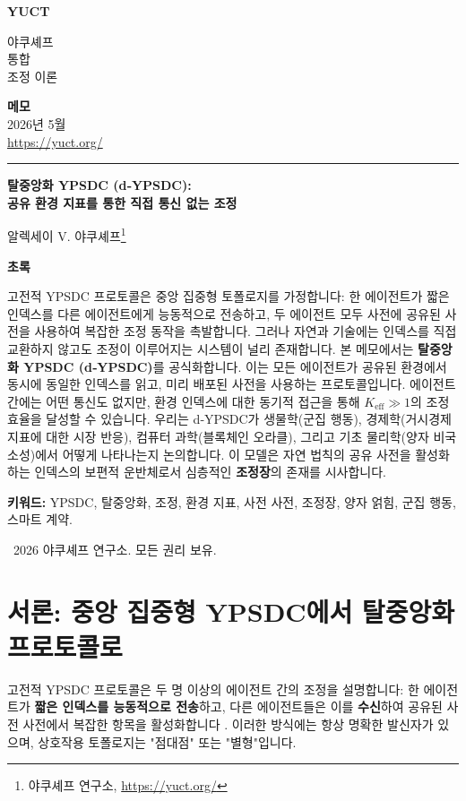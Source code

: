 \documentclass[11pt,a4paper]{article}
\newcommand{\makeheader}{%
	\noindent
	\begin{minipage}{0.17\textwidth}
		\raggedright
		{\sffamily\bfseries\color{skyblue}\fontsize{46}{46}\selectfont YUCT}%
	\end{minipage}%
	\hspace{30pt}
	\begin{minipage}{0.32\textwidth}
		\raggedright
		{\sffamily\fontsize{11}{13}\selectfont 야쿠셰프\\ 통합\\ 조정 이론}%
	\end{minipage}%
	\hfill
	\begin{minipage}{0.38\textwidth}
		\raggedleft
		{\sffamily\bfseries 메모}\\
		{\sffamily 2026년 5월}\\
		{\sffamily\footnotesize \url{https://yuct.org/}}%
	\end{minipage}
	\par\vspace{5pt}
	\noindent\textcolor{gold}{\rule{\textwidth}{1.6pt}}
	\par\vspace{0pt}
}
\begin{document}
	\renewcommand{\thepage}{\arabic{page}}
	\thispagestyle{firstpage}
	\makeheader
	
	\vspace{0cm}
	{\LARGE\bfseries 탈중앙화 YPSDC (d‑YPSDC): \\ 공유 환경 지표를 통한 직접 통신 없는 조정 \par}
	\vspace{0.2cm}
	
	{\large 알렉세이 V. 야쿠셰프\footnote{야쿠셰프 연구소, \url{https://yuct.org/}}} \\
	\vspace{0.0cm}
	
	{\color{darkblue}\textbf{\LARGE 초록}} \par
	{\large
		\noindent
		고전적 YPSDC 프로토콜은 중앙 집중형 토폴로지를 가정합니다: 한 에이전트가 짧은 인덱스를 다른 에이전트에게 능동적으로 전송하고, 두 에이전트 모두 사전에 공유된 사전을 사용하여 복잡한 조정 동작을 촉발합니다. 그러나 자연과 기술에는 인덱스를 직접 교환하지 않고도 조정이 이루어지는 시스템이 널리 존재합니다. 본 메모에서는 \textbf{탈중앙화 YPSDC (d‑YPSDC)}를 공식화합니다. 이는 모든 에이전트가 공유된 환경에서 동시에 동일한 인덱스를 읽고, 미리 배포된 사전을 사용하는 프로토콜입니다. 에이전트 간에는 어떤 통신도 없지만, 환경 인덱스에 대한 동기적 접근을 통해 \(K_{\mathrm{eff}} \gg 1\)의 조정 효율을 달성할 수 있습니다. 우리는 d‑YPSDC가 생물학(군집 행동), 경제학(거시경제 지표에 대한 시장 반응), 컴퓨터 과학(블록체인 오라클), 그리고 기초 물리학(양자 비국소성)에서 어떻게 나타나는지 논의합니다. 이 모델은 자연 법칙의 공유 사전을 활성화하는 인덱스의 보편적 운반체로서 심층적인 \textbf{조정장}의 존재를 시사합니다.
	}
	
	\vspace{0.1cm}
	\noindent
	{\color{darkblue}\textbf{키워드:}} YPSDC, 탈중앙화, 조정, 환경 지표, 사전 사전, 조정장, 양자 얽힘, 군집 행동, 스마트 계약.
	
	\vspace{0.5cm}
	\noindent
	\textcopyright\ 2026 야쿠셰프 연구소. 모든 권리 보유.
	
	\tableofcontents
	\newpage
	
	\section{서론: 중앙 집중형 YPSDC에서 탈중앙화 프로토콜로}
	
	고전적 YPSDC 프로토콜은 두 명 이상의 에이전트 간의 조정을 설명합니다: 한 에이전트가 \textbf{짧은 인덱스를 능동적으로 전송}하고, 다른 에이전트들은 이를 \textbf{수신}하여 공유된 사전 사전에서 복잡한 항목을 활성화합니다 \cite{YUCT}. 이러한 방식에는 항상 명확한 발신자가 있으며, 상호작용 토폴로지는 "점대점" 또는 "별형"입니다.
	
\end{document}
